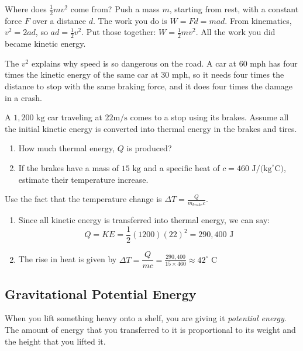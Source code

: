 Where does $\frac{1}{2}mv^2$ come from? Push a mass $m$, starting from rest, with a constant force $F$ over a distance $d$. The work you do is $W = Fd = mad$. From kinematics, $v^2 = 2ad$, so $ad = \frac{1}{2}v^2$. Put those together: $W = \frac{1}{2}mv^2$. All the work you did became kinetic energy.

The $v^2$ explains why speed is so dangerous on the road. A car at 60 mph has four times the kinetic energy of the same car at 30 mph, so it needs four times the distance to stop with the same braking force, and it does four times the damage in a crash.

\begin{Exercise}[title={Kinetic and Thermal Energy}, label=energyBrakingCar]
  A $1,200 \text{ kg}$ car traveling at $22 \text{m/s}$ comes to a stop using its brakes.
  Assume all the initial kinetic energy is converted into thermal energy in the brakes and tires.

  \begin{enumerate}[label=(\alph*)]
    \item How much thermal energy, $Q$ is produced?
    \item If the brakes have a mass of $15 \text{ kg}$ and a specific heat of $c = 460 \text{ J/(kg}^\circ\text{C)}$, estimate their temperature increase.
  \end{enumerate}
  Use the fact that the temperature change is $\Delta T = \frac{Q}{m_{brake}c}$.
\end{Exercise}
\begin{Answer}[ref=energyBrakingCar]
  \begin{enumerate}[label=(\alph*)]
    \item Since all kinetic energy is transferred into thermal energy, we can say:
    \[Q = KE = \frac{1}{2}(1200)(22)^2 = 290,400 \text{ J}\]
    \item The rise in heat is given by $\Delta T = \dfrac{Q}{mc} = \frac{290,400}{15 \times 460} \approx 42^\circ \text{ C}$
  \end{enumerate}
\end{Answer}
\subsection{Gravitational Potential Energy}


When you lift something heavy onto a shelf, you are giving it \textit{potential energy}. The amount of energy that you transferred to it is proportional to its 
weight and the height that you lifted it.

